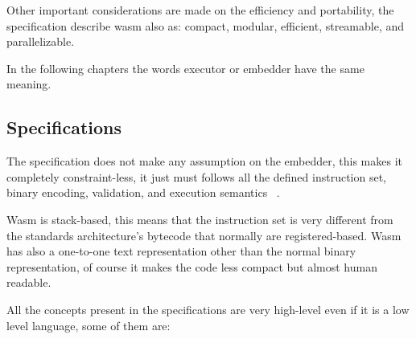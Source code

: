 \documentclass[../main.tex]{subfiles}
\begin{document}
Other important considerations are made on the efficiency and portability, the specification describe wasm also as: compact, modular, efficient, streamable, and parallelizable.


In the following chapters the words executor or embedder have the same meaning.

\subsection{Specifications}

The specification does not make any assumption on the embedder, this makes it completely constraint-less, it just must follows all the defined instruction set, binary encoding, validation, and execution semantics ~\cite{wasm-core-spec}.

Wasm is stack-based, this means that the instruction set is very different from the standards architecture's bytecode that normally are registered-based. Wasm has also a one-to-one text representation other than the normal binary representation, of course it makes the code less compact but almost human readable.

All the concepts present in the specifications are very high-level even if it is a low level language, some of them are:
\end{document}
